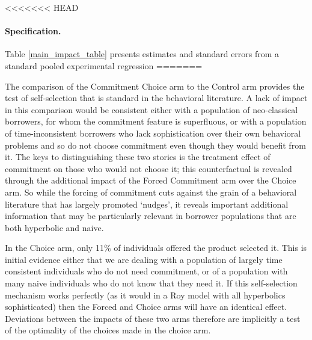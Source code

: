 \documentclass[oneside,11pt]{article}
\begin{document}
<<<<<<< HEAD


\paragraph{Specification.} Table \ref{main_impact_table} presents estimates and standard errors from a standard pooled experimental regression 
=======

The comparison of the Commitment Choice arm to the Control arm provides the test of self-selection that is standard in the behavioral literature.  A lack of impact in this comparison would be consistent either with a population of neo-classical borrowers, for whom the commitment feature is superfluous, or with a population of time-inconsistent borrowers who lack sophistication over their own behavioral problems and so do not choose commitment even though they would benefit from it.  The keys to distinguishing these two stories is the treatment effect of commitment on those who would not choose it; this counterfactual is revealed through the additional impact of the Forced Commitment arm over the Choice arm.  So while the forcing of commitment cuts against the grain of a behavioral literature that has largely promoted `nudges', it reveals important additional information that may be particularly relevant in borrower populations that are both hyperbolic and naive.


In the Choice arm, only 11\% of individuals offered the product selected it. This is initial evidence either that we are dealing with a population of largely time consistent individuals who do not need commitment, or of a population with many naive individuals who do not know that they need it.  If this self-selection mechanism works perfectly (as it would in a Roy model with all hyperbolics sophisticated) then the Forced and Choice arms will have an identical effect.  Deviations between the impacts of these two arms therefore are implicitly a test of the optimality of the choices made in the choice arm.  
\end{document}
